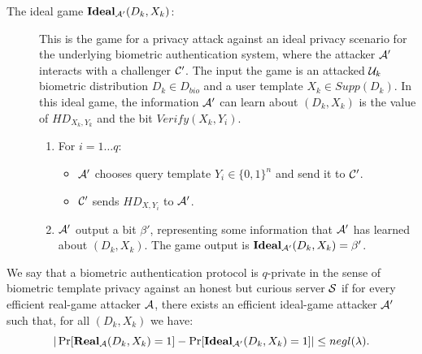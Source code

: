 \begin{description}
\item[The ideal game $\mathbf{Ideal}_{\mathcal{A}'}(D_k,X_k)$:] This is the game for a privacy attack against an ideal
  privacy scenario for the underlying biometric authentication system, where the attacker $\mathcal{A}'$ interacts with a
  challenger $\mathcal{C}'$. The input the game is an attacked $\mathcal{U}_k$ biometric distribution $D_k \in D_{bio}$ and a
  user template $X_k \in Supp(D_k)$. In this ideal game, the information $\mathcal{A}'$ can learn about $(D_k,X_k)$ is the
  value of \(HD_{X_{k}, Y_{k}}\) and the bit $Verify(X_k,Y_i)$.
  \begin{enumerate}
  \item For $i = 1 \dots q$:
    \begin{itemize}
    \item $\mathcal{A}'$ chooses query template $Y_i \in \{0,1\}^n$ and send it to $\mathcal{C}'$.
    \item $\mathcal{C}'$ sends $HD_{X,Y_{i}}$ to $\mathcal{A}'$.
    \end{itemize}
  \item $\mathcal{A}'$ output a bit $\beta'$, representing some information that $\mathcal{A}'$ has learned about
    $(D_k,X_k)$. The game output is $\mathbf{Ideal}_{\mathcal{A}'}(D_k,X_k) = \beta'$.
  \end{enumerate}
\end{description}
\begin{definition}
   We say that a biometric authentication protocol is $q$-private in the sense of
  biometric template privacy against an honest but curious server $\mathcal{S}$ if for every efficient real-game attacker
  $\mathcal{A}$, there exists an efficient ideal-game attacker $\mathcal{A}'$ such that, for all $(D_k,X_k)$ we have:
  \[
    |\Pr[\mathbf{Real}_{\mathcal{A}}(D_k,X_k) = 1] - \Pr[\mathbf{Ideal}_{\mathcal{A}'}(D_k,X_k) = 1]| \leq negl(\lambda).
  \]
\end{definition}

